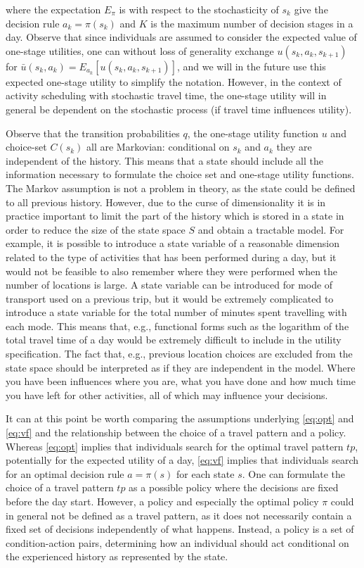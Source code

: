 where the expectation $E_\pi$ is with respect to the stochasticity of $s_k$ give the decision rule $a_k=\pi({s_k})$ and $K$ is the maximum number of decision stages in a day. Observe that since individuals are assumed to consider the expected value of one-stage utilities, one can without loss of generality exchange $u(s_k,a_k,s_{k+1})$ for $\bar{u}(s_k,a_k) = E_{a_k}[u(s_k,a_k,s_{k+1})]$, and we will in the future use this expected one-stage utility to simplify the notation. However, in the context of activity scheduling with stochastic travel time, the one-stage utility will in general be dependent on the stochastic process (if travel time influences utility).

Observe that the transition probabilities $q$, the one-stage utility function $u$ and choice-set $C(s_k)$ all are Markovian: conditional on $s_k$ and $a_k$ they are independent of the history. This means that a state should include all the information necessary to formulate the choice set and one-stage utility functions. The Markov assumption is not a problem in theory, as the state could be defined to all previous history. However, due to the curse of dimensionality it is in practice important to limit the part of the history which is stored in a state in order to reduce the size of the state space $S$ and obtain a tractable model. For example, it is possible to introduce a state variable of a reasonable dimension related to the type of activities that has been performed during a day, but it would not be feasible to also remember where they were performed when the number of locations is large. A state variable can be introduced for mode of transport used on a previous trip, but it would be extremely complicated to introduce a state variable for the total number of minutes spent travelling with each mode. This means that, e.g., functional forms such as the logarithm of the total travel time of a day would be extremely difficult to include in the utility specification. The fact that, e.g., previous location choices are excluded from the state space should be interpreted as if they are independent in the model. Where you have been influences where you are, what you have done and how much time you have left for other activities, all of which may influence your decisions. 

It can at this point be worth comparing the assumptions underlying \eqref{eq:opt} and \eqref{eq:vf} and the relationship between the choice of a travel pattern and a policy. Whereas \eqref{eq:opt} implies that individuals search for the optimal travel pattern $tp$, potentially for the expected utility of a day, \eqref{eq:vf} implies that individuals search for an optimal decision rule $a = \pi(s)$ for each state $s$. One can formulate the choice of a travel pattern $tp$ as a possible policy where the decisions are fixed before the day start. However, a policy and especially the optimal policy $\pi$ could in general not be defined as a travel pattern, as it does not necessarily contain a fixed set of decisions independently of what happens. Instead, a policy is a set of condition-action pairs, determining how an individual should act conditional on the experienced history as represented by the state.

